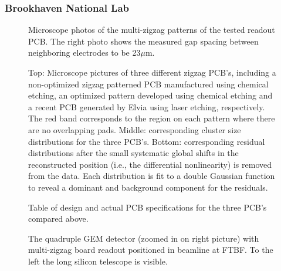 \subsubsection{Brookhaven National Lab}


 \begin{figure}[hbt]
	\centering
		
	\caption{	\label{fig:Fig1.png}
 Microscope photos of the multi-zigzag patterns of the tested readout PCB. The right photo shows the measured gap spacing between neighboring electrodes to be 23$\mu$m.}
\end{figure}
 

  \begin{figure}[hbt]
      \centering

      \caption{      \label{fig:Fig2.png}
 Top: Microscope pictures of three different zigzag PCB’s, including a non-optimized zigzag patterned PCB manufactured using chemical etching, an optimized pattern developed using chemical etching and a recent PCB generated by Elvia using laser etching, respectively. The red band corresponds to the region on each pattern where there are no overlapping pads. Middle: corresponding cluster size distributions for the three PCB’s. Bottom: corresponding residual distributions after the small systematic global shifts in the reconstructed position (i.e., the differential nonlinearity) is removed from the data. Each distribution is fit to a double Gaussian function to reveal a dominant and background component for the residuals.}
  \end{figure}
  

  \begin{figure}[hbt]
      \centering

      \caption{      \label{fig:Fig3.png}
 Table of design and actual PCB specifications for the three PCB’s compared above.}
  \end{figure}
  

\begin{figure}[hbt]
      \centering

      \caption{      \label{fig:Fig4.png}
 The quadruple GEM detector (zoomed in on right picture) with multi-zigzag board readout positioned in beamline at FTBF. To the left the long silicon telescope is visible.}
  \end{figure}
  
